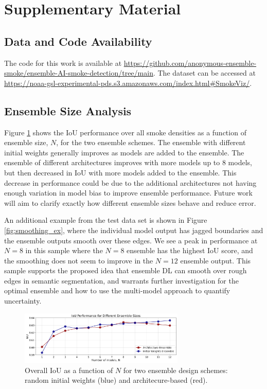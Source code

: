 \documentclass{article}
\begin{document}
\newpage

 

\section{Supplementary Material}
\subsection{Data and Code Availability}\label{sec:data-code} The code for this work is available at \url{https://github.com/anonymous-ensemble-smoke/ensemble-AI-smoke-detection/tree/main}. The dataset can be accessed at \url{https://noaa-gsl-experimental-pds.s3.amazonaws.com/index.html#SmokeViz/}.

\subsection{Ensemble Size Analysis}\label{sec:ens-size} 
Figure \ref{fig:ensemble_size_plot} shows the IoU performance over all smoke densities as a function of ensemble size, $N$, for the two ensemble schemes. The ensemble with different initial weights generally improves as models are added to the ensemble. The ensemble of different architectures improves with more models up to 8 models, but then decreased in IoU with more models added to the ensemble. This decrease in performance could be due to the additional architectures not having enough variation in model bias to improve ensemble performance. Future work will aim to clarify exactly how different ensemble sizes behave and reduce error. 

An additional example from the test data set is shown in Figure \ref{fig:smoothing_ex}, where the individual model output has jagged boundaries and the ensemble outputs smooth over these edges. We see a peak in performance at $N=8$ in this sample where the $N=8$ ensemble has the highest IoU score, and the smoothing does not seem to improve in the $N=12$ ensemble output. This sample supports the proposed idea that ensemble DL can smooth over rough edges in semantic segmentation, and warrants further investigation for the optimal ensemble and how to use the multi-model approach to quantify uncertainty. 
\begin{figure}
    \centering
    \includegraphics[width=0.70\textwidth]{ensemble_size_plot.png}
    \caption{\RaggedRight Overall IoU as a function of $N$ for two ensemble design schemes: random initial weights (blue) and architecure-based (red).}
    \label{fig:ensemble_size_plot}
\end{figure}
\end{document}
